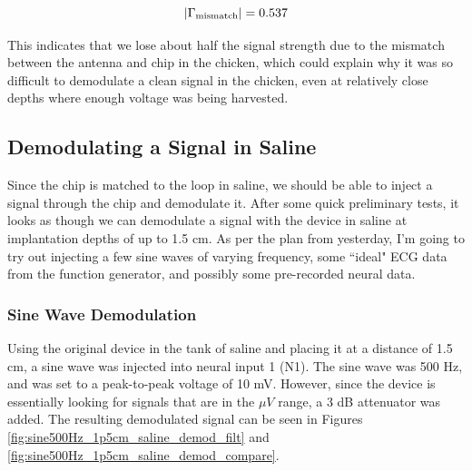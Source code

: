 \documentclass[12pt,onecolumn,titlepage]{article}
\begin{document}
\[|\Gamma_{{\rm{mismatch}}}| = 0.537 \]

This indicates that we lose about half the signal strength due to the mismatch between the antenna and chip in the chicken, which could explain why it was so difficult to demodulate a clean signal in the chicken, even at relatively close depths where enough voltage was being harvested. 

\subsection{Demodulating a Signal in Saline}
\indent \indent Since the chip is matched to the loop in saline, we should be able to inject a signal through the chip and demodulate it. After some quick preliminary tests, it looks as though we can demodulate a signal with the device in saline at implantation depths of up to 1.5 cm. As per the plan from yesterday, I'm going to try out injecting a few sine waves of varying frequency, some ``ideal" ECG data from the function generator, and possibly some pre-recorded neural data.

\subsubsection{Sine Wave Demodulation}
\indent \indent Using the original device in the tank of saline and placing it at a distance of 1.5 cm, a sine wave was injected into neural input 1 (N1). The sine wave was 500 Hz, and was set to a peak-to-peak voltage of 10 mV. However, since the device is essentially looking for signals that are in the $\mu V$ range, a 3 dB attenuator was added. The resulting demodulated signal can be seen in Figures \ref{fig:sine500Hz_1p5cm_saline_demod_filt} and \ref{fig:sine500Hz_1p5cm_saline_demod_compare}.
\end{document}
